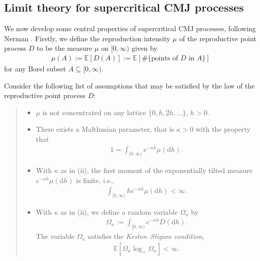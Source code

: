 \documentclass[a4,12pt]{amsart}
\numberwithin{equation}{section}
\begin{document}
\subsection{Limit theory for supercritical CMJ processes} \label{sec:CMJlimit}

	We now develop some central properties of supercritical CMJ  processes, 
	following Nerman \cite{nerman}. Firstly, we define the reproduction intensity $\mu$ 
	of the reproductive point process $D$ to be the measure $\mu$ on $[0,\infty)$ given 
	by
	\begin{align*}
		\mu(A) := \mathbb{E} [ D(A) ] := \mathbb{E} [ \# \{ \text{points of $D$ in $A$} \} ]
	\end{align*}
	for any Borel subset $A\subseteq [0,\infty)$. 

    Consider the following list of assumptions that may be satisfied by the law of the reproductive point process $D$:
    \begin{quote} %
    \normalsize
	\begin{itemize}
		\item[(i)] $\mu$ is not concentrated on any lattice $\{0,h,2h,\ldots\}$, $h>0$.
		\item[(ii)] There exists a Malthusian parameter, that is $\kappa > 0$ with the property that	
			\begin{align*}
				1 = \int_{[0,\infty)} e^{ - \kappa h } \mu( \mathrm{d}h).
			\end{align*}
 		\item[(iii)] With $\kappa$ as in (ii), the first moment of the exponentially tilted measure $e^{ - \kappa h } \mu( \mathrm{d}h)$ is finite, i.e.,
			\begin{align} \label{eq:firstmoment}
				\int_{[0,\infty)}he^{ - \kappa h } \mu( \mathrm{d}h) < \infty.
			\end{align}
        \item[(iv)] With $\kappa$ as in (ii), we define a random variable $\Omega_\kappa$ by 
	\begin{align*}
		\Omega_\kappa := \int_{[0,\infty) } e^{ - \kappa h } D(\mathrm{d}h).
	\end{align*}
    The variable $\Omega_\kappa$ satisfies the \emph{Kesten--Stigum condition}, 
	\begin{align} \label{eq:KS}
		\mathbb{E} \left[ \Omega_\kappa \log_+ \Omega_\kappa \right] < \infty.
	\end{align}
	\end{itemize}
    \end{quote}
\end{document}

